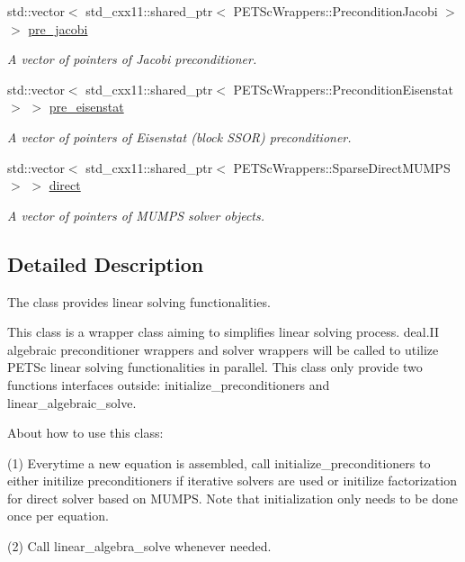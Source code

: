 \begin{DoxyCompactItemize}
std\+::vector$<$ std\+\_\+cxx11\+::shared\+\_\+ptr$<$ P\+E\+T\+Sc\+Wrappers\+::\+Precondition\+Jacobi $>$ $>$ \hyperlink{class_preconditioner_solver_ab2379323cfbca020045ec5dd4ab708dc}{pre\+\_\+jacobi}
\begin{DoxyCompactList}\small\item\em A vector of pointers of Jacobi preconditioner. \end{DoxyCompactList}\item 
std\+::vector$<$ std\+\_\+cxx11\+::shared\+\_\+ptr$<$ P\+E\+T\+Sc\+Wrappers\+::\+Precondition\+Eisenstat $>$ $>$ \hyperlink{class_preconditioner_solver_aab4bd157aebca7681283ff6cf0e69392}{pre\+\_\+eisenstat}
\begin{DoxyCompactList}\small\item\em A vector of pointers of Eisenstat (block S\+S\+OR) preconditioner. \end{DoxyCompactList}\item 
std\+::vector$<$ std\+\_\+cxx11\+::shared\+\_\+ptr$<$ P\+E\+T\+Sc\+Wrappers\+::\+Sparse\+Direct\+M\+U\+M\+PS $>$ $>$ \hyperlink{class_preconditioner_solver_acd3bde261fb29c50e15ffe6ecd78ee5f}{direct}
\begin{DoxyCompactList}\small\item\em A vector of pointers of M\+U\+M\+PS solver objects. \end{DoxyCompactList}\end{DoxyCompactItemize}


\subsection{Detailed Description}
The class provides linear solving functionalities. 

This class is a wrapper class aiming to simplifies linear solving process. deal.\+II algebraic preconditioner wrappers and solver wrappers will be called to utilize P\+E\+T\+Sc linear solving functionalities in parallel. This class only provide two functions interfaces outside\+: initialize\+\_\+preconditioners and linear\+\_\+algebraic\+\_\+solve.

About how to use this class\+:

(1) Everytime a new equation is assembled, call initialize\+\_\+preconditioners to either initilize preconditioners if iterative solvers are used or initilize factorization for direct solver based on M\+U\+M\+PS. Note that initialization only needs to be done once per equation.

(2) Call linear\+\_\+algebra\+\_\+solve whenever needed.

